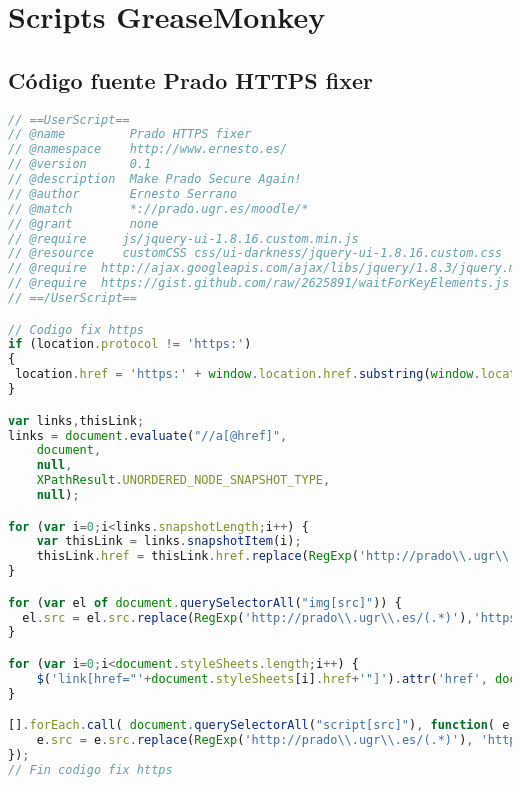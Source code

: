 \newpage
\section{Scripts GreaseMonkey}

\subsection{Código fuente Prado HTTPS fixer}

\begin{lstlisting}[language=javascript]
// ==UserScript==
// @name         Prado HTTPS fixer
// @namespace    http://www.ernesto.es/
// @version      0.1
// @description  Make Prado Secure Again!
// @author       Ernesto Serrano
// @match        *://prado.ugr.es/moodle/*
// @grant        none
// @require     js/jquery-ui-1.8.16.custom.min.js
// @resource    customCSS css/ui-darkness/jquery-ui-1.8.16.custom.css
// @require  http://ajax.googleapis.com/ajax/libs/jquery/1.8.3/jquery.min.js
// @require  https://gist.github.com/raw/2625891/waitForKeyElements.js
// ==/UserScript==

// Codigo fix https
if (location.protocol != 'https:')
{
 location.href = 'https:' + window.location.href.substring(window.location.protocol.length);
}

var links,thisLink;
links = document.evaluate("//a[@href]",
    document,
    null,
    XPathResult.UNORDERED_NODE_SNAPSHOT_TYPE,
    null);

for (var i=0;i<links.snapshotLength;i++) {
    var thisLink = links.snapshotItem(i);
    thisLink.href = thisLink.href.replace(RegExp('http://prado\\.ugr\\.es/(.*)'), 'https://prado.ugr.es/$1');
}

for (var el of document.querySelectorAll("img[src]")) {
  el.src = el.src.replace(RegExp('http://prado\\.ugr\\.es/(.*)'),'https://prado.ugr.es/$1');
}

for (var i=0;i<document.styleSheets.length;i++) {
    $('link[href="'+document.styleSheets[i].href+'"]').attr('href', document.styleSheets[i].href.replace(RegExp('http://prado\\.ugr\\.es/(.*)'), 'https://prado.ugr.es/$1'));
}

[].forEach.call( document.querySelectorAll("script[src]"), function( e ) {
    e.src = e.src.replace(RegExp('http://prado\\.ugr\\.es/(.*)'), 'https://prado.ugr.es/$1');
});
// Fin codigo fix https
\end{lstlisting}

